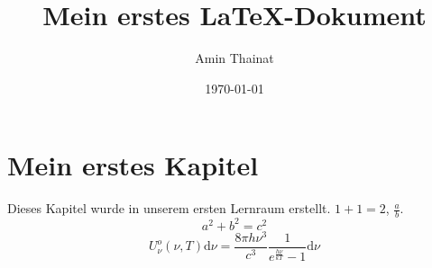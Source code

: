 \documentclass{article}
\title{Mein erstes \LaTeX-Dokument}
\author{Amin Thainat}
\date{\today}
\newcommand{\intd}[1]{\text{d}#1}
\begin{document}
	\maketitle
	\tableofcontents
\section{Mein erstes Kapitel}
Dieses Kapitel wurde in unserem ersten Lernraum erstellt. 
$1+1=2$, $\frac{a}{b}$.
\begin{equation}
a^2+b^2=c^2
\end{equation}
\begin{equation}
	U_{\nu}^{o}(\nu,T)\intd{\nu}
	=
	\frac{8\pi h\nu^3}{c^3}
	\frac{1}{e^{\frac{h\nu}{kT}}-1}\intd{\nu}\label{eq:Strahlungsgesetz}
\end{equation}
\end{document}
